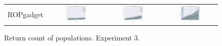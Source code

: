 \documentclass{article}
\begin{document}
\begin{landscape}
\begin{figure}[t]
\begin{center}
\begin{tabular}{c c c c}
    ROPgadget & \includegraphics[align=c,width=0.42\textwidth]{rc/e3/4} & \includegraphics[align=c,width=0.42\textwidth]{rc/e3/5} & \includegraphics[align=c,width=0.42\textwidth]{rc/e3/6} \\
\end{tabular}
\end{center}
\caption{Return count of populations. Experiment 3.}
\label{fig:rc/e3}
\end{figure}


\end{landscape}
\end{document}
